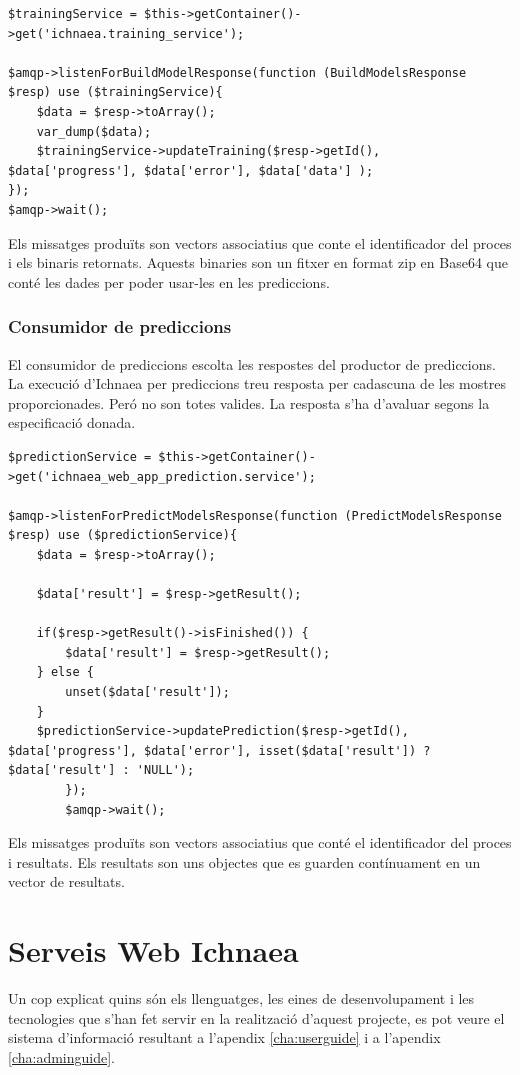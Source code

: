 \begin{lstlisting}
$trainingService = $this->getContainer()->get('ichnaea.training_service');
		
$amqp->listenForBuildModelResponse(function (BuildModelsResponse $resp) use ($trainingService){
	$data = $resp->toArray();
	var_dump($data);
	$trainingService->updateTraining($resp->getId(), $data['progress'], $data['error'], $data['data'] );
});
$amqp->wait();
\end{lstlisting}

Els missatges produïts son vectors associatius que conte el identificador del proces i els binaris retornats. Aquests binaries son un fitxer en format zip en Base64 que cont\'{e} les dades per poder usar-les en les prediccions.

\subsubsection{Consumidor de prediccions}
El consumidor de prediccions escolta les respostes del productor de prediccions.\\

La execució d'Ichnaea per prediccions treu resposta per cadascuna de les mostres proporcionades. Peró no son totes valides. La resposta s'ha d'avaluar segons la especificació donada. 
\begin{lstlisting}
$predictionService = $this->getContainer()->get('ichnaea_web_app_prediction.service');
		
$amqp->listenForPredictModelsResponse(function (PredictModelsResponse $resp) use ($predictionService){
	$data = $resp->toArray();
	
	$data['result'] = $resp->getResult();

	if($resp->getResult()->isFinished()) {
 		$data['result'] = $resp->getResult();
	} else {
		unset($data['result']);
	}
	$predictionService->updatePrediction($resp->getId(), $data['progress'], $data['error'], isset($data['result']) ? $data['result'] : 'NULL');
		});
		$amqp->wait();
\end{lstlisting}

Els missatges produïts son vectors associatius que cont\'{e} el identificador del proces i resultats. Els resultats son uns objectes que es guarden contínuament en un vector de resultats.


\section{Serveis Web Ichnaea}
Un cop explicat quins són els llenguatges, les eines de desenvolupament i les tecnologies que s’han fet servir en la realització d’aquest projecte, es pot veure el sistema d’informació resultant a l'apendix \ref{cha:userguide}
i a l'apendix \ref{cha:adminguide}.\\ 
 
